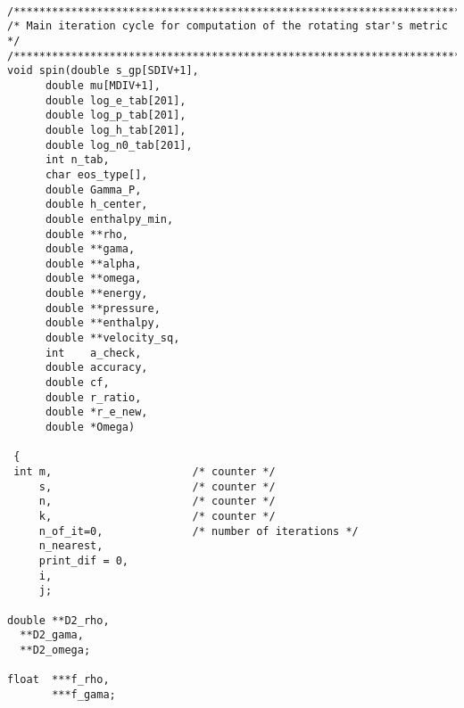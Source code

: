 \begin{verbatim}

/*************************************************************************/
/* Main iteration cycle for computation of the rotating star's metric    */
/*************************************************************************/
void spin(double s_gp[SDIV+1],
	  double mu[MDIV+1],
	  double log_e_tab[201], 
	  double log_p_tab[201], 
	  double log_h_tab[201],
	  double log_n0_tab[201], 
	  int n_tab,                 
	  char eos_type[],
	  double Gamma_P, 
	  double h_center,
	  double enthalpy_min,
	  double **rho,
	  double **gama,
	  double **alpha,
	  double **omega,
	  double **energy,
	  double **pressure,
	  double **enthalpy,
	  double **velocity_sq,
	  int    a_check, 
	  double accuracy,
	  double cf,
	  double r_ratio,
	  double *r_e_new,
	  double *Omega)

 {
 int m,                      /* counter */
     s,                      /* counter */
     n,                      /* counter */
     k,                      /* counter */
     n_of_it=0,              /* number of iterations */
     n_nearest,
     print_dif = 0,
     i,
     j;

double **D2_rho,
  **D2_gama,
  **D2_omega;

float  ***f_rho,
       ***f_gama;


\end{verbatim}
